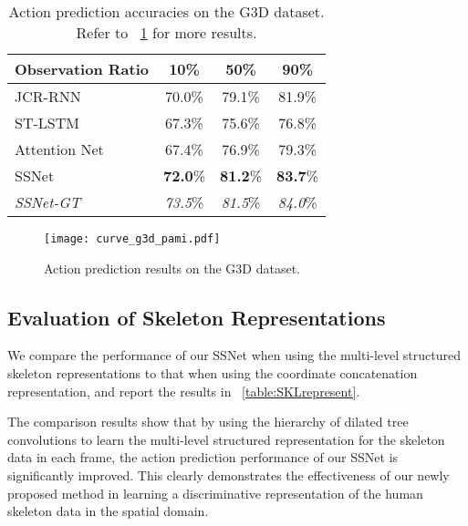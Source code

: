 \documentclass[10pt,twocolumn,letterpaper]{article}
\begin{document}
\begin{table}[htbp]
	\caption{Action prediction accuracies on the G3D dataset.
        Refer to \figurename{~\ref{fig:result_curves_G3D}} for more results.
	}
	\label{table:resultG3D}
	\centering
    \small
	\begin{tabular}{lccc}
    \toprule
    Observation Ratio                    & 10\%   & 50\%   & 90\% \\
    \midrule
    JCR-RNN                              & 70.0\% & 79.1\% & 81.9\% \\
    ST-LSTM                              & 67.3\% & 75.6\% & 76.8\% \\
    Attention Net                        & 67.4\% & 76.9\% & 79.3\% \\
    \midrule
    SSNet                                & \textbf{72.0}\%& \textbf{81.2}\% & \textbf{83.7}\% \\
    \midrule
    \emph{SSNet-GT}                      & \emph{73.5}\% & \emph{81.5}\% & \emph{84.0}\% \\
    \bottomrule
	\end{tabular}
\end{table}

\begin{figure}[htbp]
		\centering
		\centerline{\texttt{[image: curve\_g3d\_pami.pdf]}}
	\caption{Action prediction results on the G3D dataset.}
	\label{fig:result_curves_G3D}
\end{figure}







\subsection{Evaluation of Skeleton Representations}
\label{sec:experiment:skeRep}

We compare the performance of our SSNet when using the multi-level structured skeleton representations to that when using the coordinate concatenation representation,
and report the results in \tablename{~\ref{table:SKLrepresent}}.

The comparison results show that
by using the hierarchy of dilated tree convolutions to learn the multi-level structured representation for the skeleton data in each frame,
the action prediction performance of our SSNet is significantly improved.
This clearly demonstrates the effectiveness of our newly proposed method in learning a discriminative representation of the human skeleton data in the spatial domain.
\end{document}
